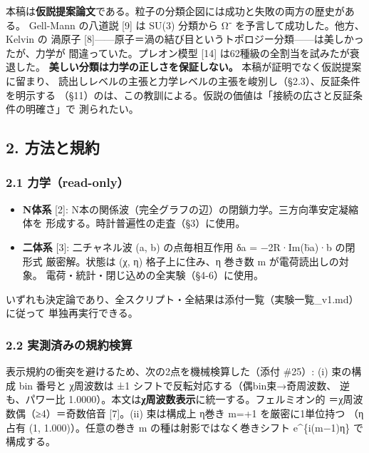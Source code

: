 \documentclass[
]{ltjsarticle}
\providecommand{\tightlist}{%
  \setlength{\itemsep}{0pt}\setlength{\parskip}{0pt}}
\begin{document}
本稿は\textbf{仮説提案論文}である。粒子の分類企図には成功と失敗の両方の歴史がある。
Gell-Mann の八道説 {[}9{]} は SU(3) 分類から Ω⁻
を予言して成功した。他方、Kelvin の 渦原子
{[}8{]}------原子＝渦の結び目というトポロジー分類------は美しかったが、力学が
間違っていた。プレオン模型 {[}14{]} は62種級の全割当を試みたが衰退した。
\textbf{美しい分類は力学の正しさを保証しない。}
本稿が証明でなく仮説提案に留まり、
読出しレベルの主張と力学レベルの主張を峻別し（§2.3）、反証条件を明示する
（§11）のは、この教訓による。仮説の価値は「接続の広さと反証条件の明確さ」で
測られたい。

\subsection{2. 方法と規約}\label{ux65b9ux6cd5ux3068ux898fux7d04}

\subsubsection{2.1 力学（read-only）}\label{ux529bux5b66read-only}

\begin{itemize}
\tightlist
\item
  \textbf{N体系} {[}2{]}:
  N本の関係波（完全グラフの辺）の閉鎖力学。三方向準安定凝縮体を
  形成する。時計普遍性の走査（§3）に使用。
\item
  \textbf{二体系} {[}3{]}: 二チャネル波 (a, b) の点毎相互作用 δa =
  −2R·Im(b̄a)·b の閉形式 厳密解。状態は (χ, η) 格子上に住み、η 巻き数 m
  が電荷読出しの対象。 電荷・統計・閉じ込めの全実験（§4-6）に使用。
\end{itemize}

いずれも決定論であり、全スクリプト・全結果は添付一覧（実験一覧\_v1.md）に従って
単独再実行できる。

\subsubsection{2.2
実測済みの規約検算}\label{ux5b9fux6e2cux6e08ux307fux306eux898fux7d04ux691cux7b97}

表示規約の衝突を避けるため、次の2点を機械検算した（添付 \#25）: (i)
束の構成 bin 番号と χ周波数は ±1
シフトで反転対応する（偶bin束→奇周波数、 逆も、パワー比
1.0000）。本文は\textbf{χ周波数表示}に統一する。フェルミオン的
＝χ周波数偶（≥4）＝奇数倍音 {[}7{]}。(ii) 束は構成上 η巻き m=+1
を厳密に1単位持つ （η占有 (1, 1.000)）。任意の巻き m
の種は射影ではなく巻きシフト e\^{}\{i(m−1)η\} で 構成する。
\end{document}
